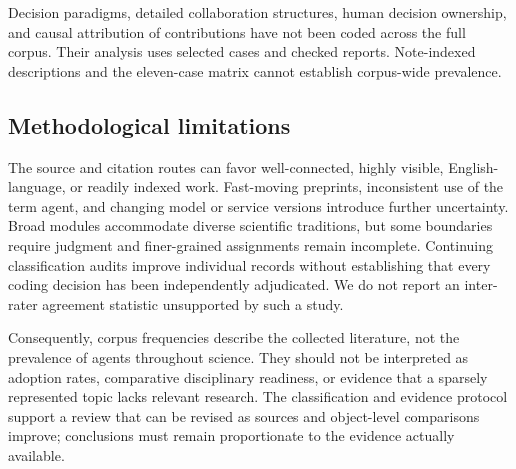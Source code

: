 Decision paradigms, detailed collaboration structures, human decision ownership, and causal attribution of contributions have not been coded across the full corpus. Their analysis uses selected cases and checked reports. Note-indexed descriptions and the eleven-case matrix cannot establish corpus-wide prevalence.

\subsection{Methodological limitations}

The source and citation routes can favor well-connected, highly visible, English-language, or readily indexed work. Fast-moving preprints, inconsistent use of the term agent, and changing model or service versions introduce further uncertainty. Broad modules accommodate diverse scientific traditions, but some boundaries require judgment and finer-grained assignments remain incomplete. Continuing classification audits improve individual records without establishing that every coding decision has been independently adjudicated. We do not report an inter-rater agreement statistic unsupported by such a study.

Consequently, corpus frequencies describe the collected literature, not the prevalence of agents throughout science. They should not be interpreted as adoption rates, comparative disciplinary readiness, or evidence that a sparsely represented topic lacks relevant research. The classification and evidence protocol support a review that can be revised as sources and object-level comparisons improve; conclusions must remain proportionate to the evidence actually available.
